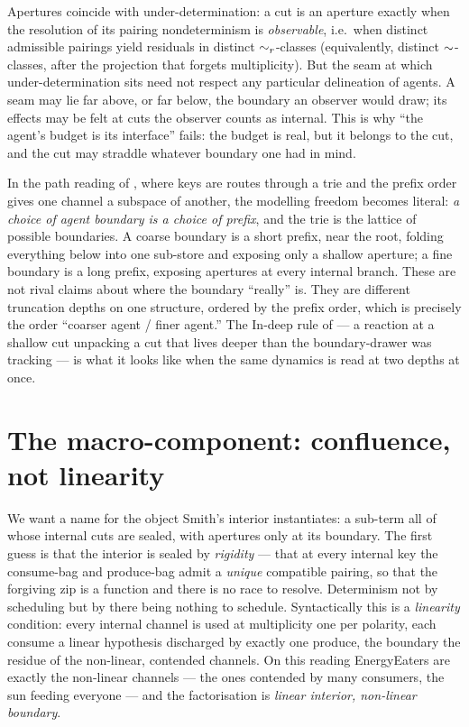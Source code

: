 \begin{remark}\label{ndo:rmk:seam}
Apertures coincide with under-determination: a cut is an aperture exactly when the
resolution of its pairing nondeterminism is \emph{observable}, i.e.\ when distinct
admissible pairings yield residuals in distinct $\sim_{r}$-classes (equivalently,
distinct $\sim$-classes, after the projection that forgets multiplicity). But
the seam at which under-determination sits need not respect any particular
delineation of agents. A seam may lie far above, or far below, the boundary an
observer would draw; its effects may be felt at cuts the observer counts as
internal. This is why ``the agent's budget is its interface'' fails: the budget is
real, but it belongs to the cut, and the cut may straddle whatever boundary one
had in mind.
\end{remark}

In the path reading of \cite{paths}, where keys are routes through a trie and the
prefix order gives one channel a subspace of another, the modelling freedom
becomes literal: \emph{a choice of agent boundary is a choice of prefix}, and the
trie is the lattice of possible boundaries. A coarse boundary is a short prefix,
near the root, folding everything below into one sub-store and exposing only a
shallow aperture; a fine boundary is a long prefix, exposing apertures at every
internal branch. These are not rival claims about where the boundary ``really''
is. They are different truncation depths on one structure, ordered by the prefix
order, which is precisely the order ``coarser agent / finer agent.'' The In-deep
rule of \cite{paths} --- a reaction at a shallow cut unpacking a cut that lives
deeper than the boundary-drawer was tracking --- is what it looks like when the
same dynamics is read at two depths at once.


\section{The macro-component: confluence, not linearity}\label{ndo:sec:macro}

We want a name for the object Smith's interior instantiates: a sub-term all of
whose internal cuts are sealed, with apertures only at its boundary. The first
guess is that the interior is sealed by \emph{rigidity} --- that at every internal
key the consume-bag and produce-bag admit a \emph{unique} compatible pairing, so
that the forgiving zip is a function and there is no race to resolve. Determinism
not by scheduling but by there being nothing to schedule. Syntactically this is a
\emph{linearity} condition: every internal channel is used at multiplicity one per
polarity, each consume a linear hypothesis discharged by exactly one produce, the
boundary the residue of the non-linear, contended channels. On this reading
\textsf{EnergyEaters} are exactly the non-linear channels --- the ones contended by
many consumers, the sun feeding everyone --- and the factorisation is
\emph{linear interior, non-linear boundary}.

